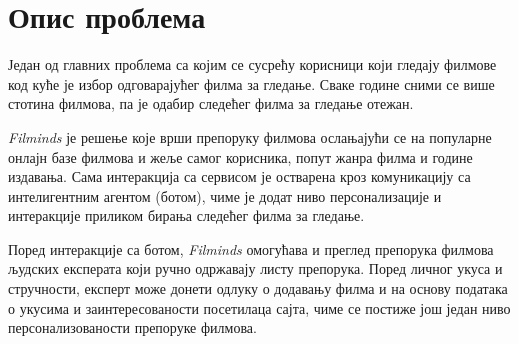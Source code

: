 \section{Опис проблема}

Један од главних проблема са којим се сусрећу корисници који гледају филмове код куће је избор
одговарајућег филма за гледање. Сваке године сними се више стотина филмова, па је одабир следећег
филма за гледање отежан.

\textit{Filminds} је решење које врши препоруку филмова ослањајући се на популарне онлајн базе
филмова и жеље самог корисника, попут жанра филма и године издавања. Сама интеракција са сервисом
је остварена кроз комуникацију са интелигентним агентом (ботом), чиме је додат ниво персонализације
и интеракције приликом бирања следећег филма за гледање.

Поред интеракције са ботом, \textit{Filminds} омогућава и преглед препорука филмова људских експерата
који ручно одржавају листу препорука. Поред личног укуса и стручности, експерт може донети одлуку о
додавању филма и на основу података о укусима и заинтересованости посетилаца сајта, чиме се постиже
још један ниво персонализованости препоруке филмова.
